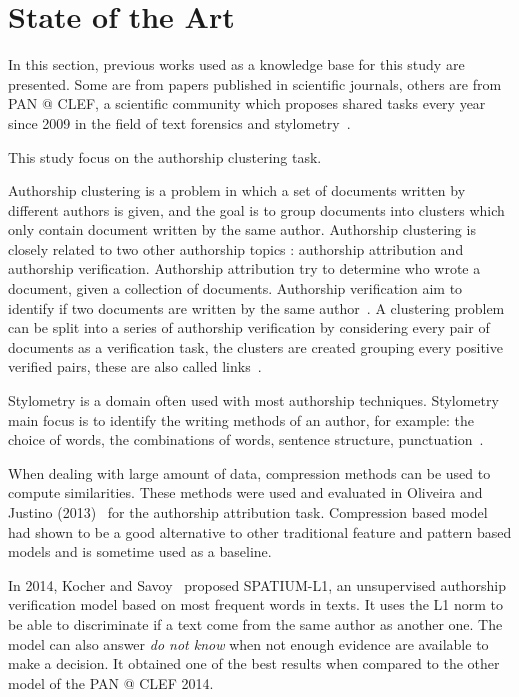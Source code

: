 \chapter{State of the Art \label{sec:state_of_the_art}}

In this section, previous works used as a knowledge base for this study are presented.
Some are from papers published in scientific journals, others are from PAN @ CLEF, a scientific community which proposes shared tasks every year since 2009 in the field of text forensics and stylometry~\cite{pan_webis}.

This study focus on the authorship clustering task.

Authorship clustering is a problem in which a set of documents written by different authors is given, and the goal is to group documents into clusters which only contain document written by the same author.
Authorship clustering is closely related to two other authorship topics : authorship attribution and authorship verification.
Authorship attribution try to determine who wrote a document, given a collection of documents.
Authorship verification aim to identify if two documents are written by the same author~\cite{pan11_verif}.
A clustering problem can be split into a series of authorship verification by considering every pair of documents as a verification task, the clusters are created grouping every positive verified pairs, these are also called links~\cite{pan16_clustering_site}.

Stylometry is a domain often used with most authorship techniques.
Stylometry main focus is to identify the writing methods of an author, for example: the choice of words, the combinations of words, sentence structure, punctuation~\cite{savoy_stylo}.

When dealing with large amount of data, compression methods can be used to compute similarities.
These methods were used and evaluated in Oliveira and Justino (2013)~\cite{comparing_compression} for the authorship attribution task.
Compression based model had shown to be a good alternative to other traditional feature and pattern based models and is sometime used as a baseline.

In 2014, Kocher and Savoy~\cite{kocher_linking} proposed SPATIUM-L1, an unsupervised authorship verification model based on most frequent words in texts.
It uses the L1 norm to be able to discriminate if a text come from the same author as another one.
The model can also answer \textit{do not know} when not enough evidence are available to make a decision.
It obtained one of the best results when compared to the other model of the PAN @ CLEF 2014.

